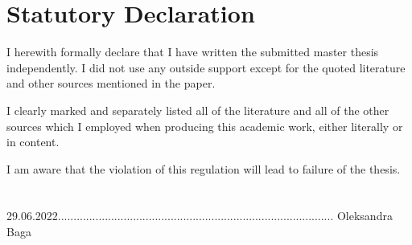 \chapter*{Statutory Declaration}
I herewith formally declare that I have written the submitted master thesis independently. I did not use any outside support except for the quoted literature and other sources mentioned in the paper. 

I clearly marked and separately listed all of the literature and all of the other sources which I employed when producing this academic work, either literally or in content. 


I am aware that the violation of this regulation will lead to failure of the thesis.\\\\\\

29.06.2022........................................................................................ Oleksandra Baga

